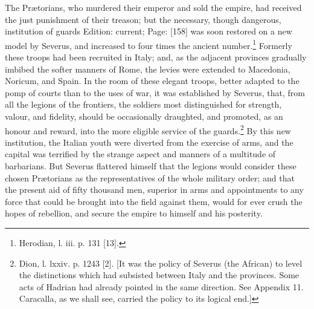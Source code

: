 The Prætorians, who murdered their emperor and sold the empire, had received the just punishment of their treason; but the necessary, though dangerous, institution of guards Edition: current; Page: [158] was soon restored on a new model by Severus, and increased to four times the ancient number.\footnote{Herodian, l. iii. p. 131 [13].} Formerly these troops had been recruited in Italy; and, as the adjacent provinces gradually imbibed the softer manners of Rome, the levies were extended to Macedonia, Noricum, and Spain. In the room of these elegant troops, better adapted to the pomp of courts than to the uses of war, it was established by Severus, that, from all the legions of the frontiers, the soldiers most distinguished for strength, valour, and fidelity, should be occasionally draughted, and promoted, as an honour and reward, into the more eligible service of the guards.\footnote{Dion, l. lxxiv. p. 1243 [2]. [It was the policy of Severus (the African) to level the distinctions which had subsisted between Italy and the provinces. Some acts of Hadrian had already pointed in the same direction. See Appendix 11. Caracalla, as we shall see, carried the policy to its logical end.]} By this new institution, the Italian youth were diverted from the exercise of arms, and the capital was terrified by the strange aspect and manners of a multitude of barbarians. But Severus flattered himself that the legions would consider these chosen Prætorians as the representatives of the whole military order; and that the present aid of fifty thousand men, superior in arms and appointments to any force that could be brought into the field against them, would for ever crush the hopes of rebellion, and secure the empire to himself and his posterity.

